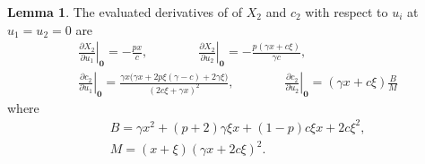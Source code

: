 \documentclass[11pt]{article}
\theoremstyle{definition}
\newtheorem{lemma}[theorem]{Lemma}
\begin{document}
\begin{lemma}\label{Lemma:derivatives}
The evaluated derivatives of of $X_2$ and $c_2$ with respect to $u_i$ at $u_1 = u_2 =0$ are
\begin{align}
&\left.\frac{\partial X_2}{\partial u_1}\right|_{\mathbf{0}} = -\frac{px}{c}, \quad\quad\quad\quad \left.\frac{\partial X_2}{\partial u_2}\right|_{\mathbf{0}} =  -\frac{p(\gamma x+c\xi)}{\gamma c}, \label{Eq:eval_1}\\
&\left.\frac{\partial c_2}{\partial u_1}\right|_{\mathbf{0}}
= \frac{\gamma x\big(\gamma x + 2p\xi(\gamma-c) + 2\gamma\xi\big)}{(2c\xi+\gamma x)^2} , \quad\quad\quad\quad
\left.\frac{\partial c_2}{\partial u_2}\right|_{\mathbf{0}}
= (\gamma x + c\xi) \frac{B}{M}	 \label{Eq:eval_2}
\end{align}
where
\begin{align*}
&B = \gamma x^2 + (p+2)\gamma \xi x + (1-p)c\xi x + 2c\xi^2, \\
&M = (x+\xi) (\gamma x + 2 c\xi)^2.
\end{align*}
\end{lemma}
\end{document}
